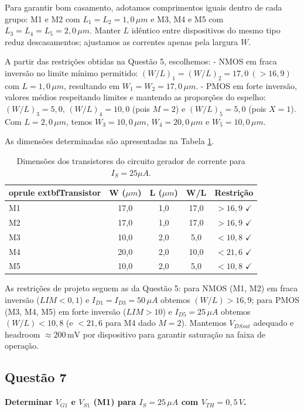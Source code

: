 ﻿\documentclass[12pt,a4paper]{article}
\begin{document}
Para garantir bom casamento, adotamos comprimentos iguais dentro de cada grupo: M1 e M2 com $L_1=L_2=1{,}0\,\mu m$ e M3, M4 e M5 com $L_3=L_4=L_5=2{,}0\,\mu m$. Manter $L$ idêntico entre dispositivos do mesmo tipo reduz descasamentos; ajustamos as correntes apenas pela largura $W$.

A partir das restrições obtidas na Questão 5, escolhemos:
- NMOS em fraca inversão no limite mínimo permitido: $(W/L)_1 = (W/L)_2 = 17{,}0\ (>16{,}9)$ com $L=1{,}0\,\mu m$, resultando em $W_1=W_2=17{,}0\,\mu m$.
- PMOS em forte inversão, valores médios respeitando limites e mantendo as proporções do espelho: $(W/L)_3 = 5{,}0$, $(W/L)_4 = 10{,}0$ (pois $M=2$) e $(W/L)_5 = 5{,}0$ (pois $X=1$). Com $L=2{,}0\,\mu m$, temos $W_3=10{,}0\,\mu m$, $W_4=20{,}0\,\mu m$ e $W_5=10{,}0\,\mu m$.

As dimensões determinadas são apresentadas na Tabela \ref{tab:dimensoes}.

\begin{table}[H]
\centering
\caption{Dimensões dos transistores do circuito gerador de corrente para $I_S = 25\mu A$.}
\label{tab:dimensoes}
\begin{tabular}{@{}lcccc@{}}
	oprule
	extbf{Transistor} & \textbf{W ($\mu m$)} & \textbf{L ($\mu m$)} & \textbf{W/L} & \textbf{Restrição} \\ \midrule
M1 & 17,0 & 1,0 & 17,0 & $> 16,9$ $\checkmark$ \\
M2 & 17,0 & 1,0 & 17,0 & $> 16,9$ $\checkmark$ \\
M3 & 10,0 & 2,0 & 5,0 & $< 10,8$ $\checkmark$ \\
M4 & 20,0 & 2,0 & 10,0 & $< 21,6$ $\checkmark$ \\
M5 & 10,0 & 2,0 & 5,0 & $< 10,8$ $\checkmark$ \\
\bottomrule
\end{tabular}
\end{table}

As restrições de projeto seguem as da Questão 5: para NMOS (M1, M2) em fraca inversão ($LIM<0{,}1$) e $I_{D1}=I_{D3}=50\,\mu A$ obtemos $(W/L)>16{,}9$; para PMOS (M3, M4, M5) em forte inversão ($LIM>10$) e $I_{D5}=25\,\mu A$ obtemos $(W/L)<10{,}8$ (e $<21{,}6$ para M4 dado $M=2$). Mantemos $V_{DSsat}$ adequado e headroom $\approx 200\,\text{mV}$ por dispositivo para garantir saturação na faixa de operação.

\subsection*{Questão 7}
	\textbf{Determinar $V_{G1}$ e $V_{S1}$ (M1) para $I_S = 25\,\mu A$ com $V_{TH} = 0{,}5\,V$.}
\end{document}
